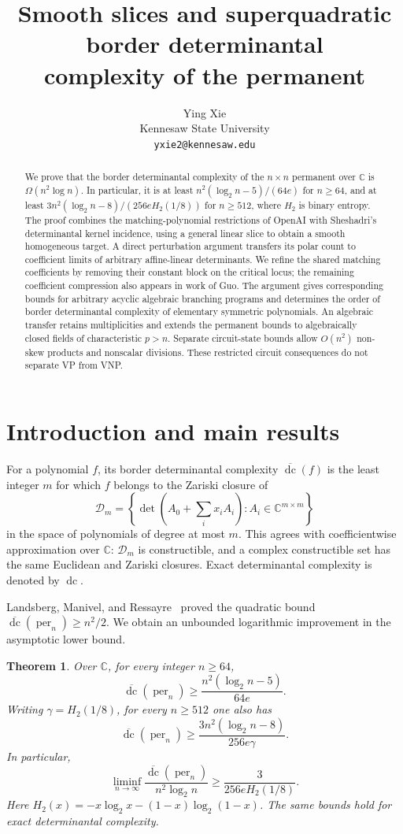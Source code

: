 \documentclass[11pt]{article}
\title{Smooth slices and superquadratic border determinantal\\
complexity of the permanent}
\author{Ying Xie\\Kennesaw State University\\
\texttt{yxie2@kennesaw.edu}}
\date{}
\newtheorem{theorem}{Theorem}[section]
\theoremstyle{remark}\newtheorem{remark}[theorem]{Remark}
\DeclareMathOperator{\per}{per}
\DeclareMathOperator{\dc}{dc}
\newcommand{\bdc}{\overline{\dc}}
\newcommand{\C}{\mathbb C}
\begin{document}
\maketitle
\begin{abstract}
We prove that the border determinantal complexity of the $n\times n$
permanent over $\mathbb C$ is $\Omega(n^2\log n)$. In particular, it is
at least $n^2(\log_2 n-5)/(64e)$ for $n\ge64$, and at least
$3n^2(\log_2 n-8)/(256eH_2(1/8))$ for $n\ge512$, where $H_2$ is
binary entropy. The proof combines the matching-polynomial restrictions
of OpenAI with Sheshadri's determinantal kernel incidence, using a
general linear slice to obtain a smooth homogeneous target. A direct
perturbation argument transfers its polar count to coefficient limits
of arbitrary affine-linear determinants. We refine the shared matching
coefficients by removing their constant block on the critical locus;
the remaining coefficient compression also appears in work of Guo.
The argument gives corresponding bounds for arbitrary acyclic algebraic
branching programs and determines the order of border determinantal
complexity of elementary symmetric polynomials. An algebraic transfer
retains multiplicities and extends the permanent bounds to algebraically
closed fields of characteristic $p>n$. Separate circuit-state bounds
allow $O(n^2)$ non-skew products and nonscalar divisions. These restricted
circuit consequences do not separate VP from VNP.
\end{abstract}

\section{Introduction and main results}

For a polynomial $f$, its border determinantal complexity $\bdc(f)$
is the least integer $m$ for which $f$ belongs to the Zariski closure of
\[
\mathcal D_m=\left\{\det\left(A_0+\sum_i x_i A_i\right):
 A_i\in\C^{m\times m}\right\}
\]
in the space of polynomials of degree at most $m$. This agrees with
coefficientwise approximation over $\C$: $\mathcal D_m$ is constructible,
and a complex constructible set has the same Euclidean and Zariski
closures. Exact determinantal complexity is denoted by $\dc$.

Landsberg, Manivel, and Ressayre~\cite{LMR} proved the quadratic bound
$\bdc(\per_n)\ge n^2/2$. We obtain an unbounded logarithmic
improvement in the asymptotic lower bound.

\begin{theorem}\label{thm:main}
Over $\mathbb C$, for every integer $n\ge64$,
\begin{equation}\label{eq:main-simple}
 \bdc(\per_n)\ge\frac{n^2(\log_2 n-5)}{64e}.
\end{equation}
Writing $\gamma=H_2(1/8)$, for every $n\ge512$ one also has
\begin{equation}\label{eq:main-compressed}
 \bdc(\per_n)\ge\frac{3n^2(\log_2 n-8)}{256e\gamma}.
\end{equation}
In particular,
\[
 \liminf_{n\to\infty}\frac{\bdc(\per_n)}{n^2\log_2 n}
 \ge\frac{3}{256eH_2(1/8)}.
\]
Here $H_2(x)=-x\log_2 x-(1-x)\log_2(1-x)$.
The same bounds hold for exact determinantal complexity.
\end{theorem}
\end{document}
